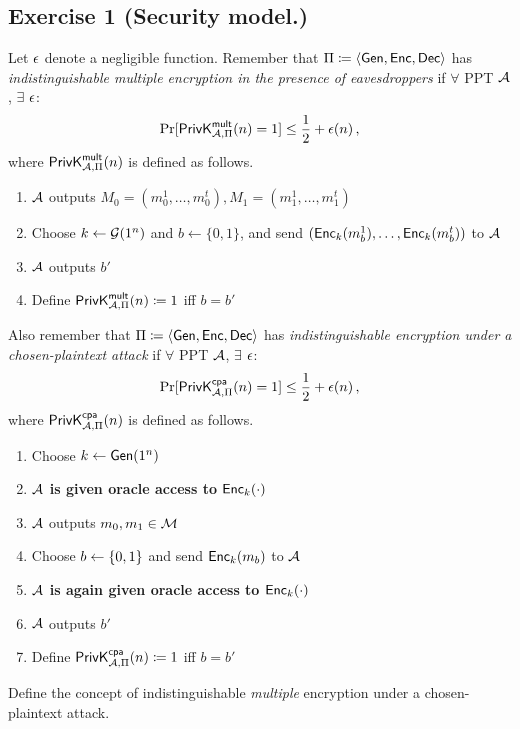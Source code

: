 

\section{}

\subsection{Exercise 1 (Security model.)}

Let $\epsilon$ denote a negligible function.
Remember that $\Pi \coloneqq \langle \operatorname{\mathsf{Gen}}, \operatorname{\mathsf{Enc}}, \operatorname{\mathsf{Dec}} \rangle$ has \emph{indistinguishable
multiple encryption in the presence of eavesdroppers} if $\forall$
PPT $\mathcal{A}$, $\exists$ $\epsilon$:
  \[\Pr[\mathsf{PrivK}_{\mathcal{A},\Pi}^\mathsf{mult}(n)=1]\leq\frac12+\epsilon(n) \,,\]
where $\mathsf{PrivK}_{\mathcal{A},\Pi}^\mathsf{mult}(n)$ is defined as follows.
\begin{enumerate}
\item   $\mathcal{A}$ outputs $M_0=(m_0^1,\ldots,m_0^t),
M_1=(m_1^1,\ldots,m_1^t)$
\item Choose $k \leftarrow \mathcal{G}(1^n)$ and $b \leftarrow \{0,1\}$, and send
  $(\operatorname{\mathsf{Enc}}_k(m_b^1),\ldots,\operatorname{\mathsf{Enc}}_k(m_b^t))$ to $\mathcal{A}$
\item $\mathcal{A}$ outputs $b'$
\item Define $\mathsf{PrivK}_{\mathcal{A},\Pi}^\mathsf{mult}(n) \coloneqq 1$ iff $b=b'$
\end{enumerate}

Also remember that $\Pi \coloneqq \langle \operatorname{\mathsf{Gen}}, \operatorname{\mathsf{Enc}}, \operatorname{\mathsf{Dec}} \rangle$ has \emph{indistinguishable
encryption under a chosen-plaintext attack} if $\forall$ PPT $\mathcal{A}$,
$\exists$ $\epsilon$:
  \[\Pr[\mathsf{PrivK}_{\mathcal{A},\Pi}^\mathsf{cpa}(n)=1]\leq\frac12+\epsilon(n) \,,\]
where $\mathsf{PrivK}_{\mathcal{A},\Pi}^\mathsf{cpa}(n)$ is defined as follows.

\begin{enumerate}
  \item Choose $k\leftarrow \operatorname{\mathsf{Gen}}(1^n)$
  \item \textbf{$\mathcal{A}$ is given oracle access to $\operatorname{\mathsf{Enc}}_k(\cdot)$}
  \item $\mathcal{A}$ outputs $m_0, m_1 \in \mathcal{M}$
  \item Choose $b\leftarrow \{0, 1\}$ and send $\operatorname{\mathsf{Enc}}_k(m_b)$ to $\mathcal{A}$
  \item \textbf{$\mathcal{A}$ is again given oracle access to $\operatorname{\mathsf{Enc}}_k(\cdot)$}
  \item $\mathcal{A}$ outputs $b'$
  \item Define $\mathsf{PrivK}_{\mathcal{A},\Pi}^\mathsf{cpa}(n) \coloneqq 1$ iff $b=b'$
\end{enumerate}

Define the concept of indistinguishable \emph{multiple} encryption under a chosen-plaintext attack.


